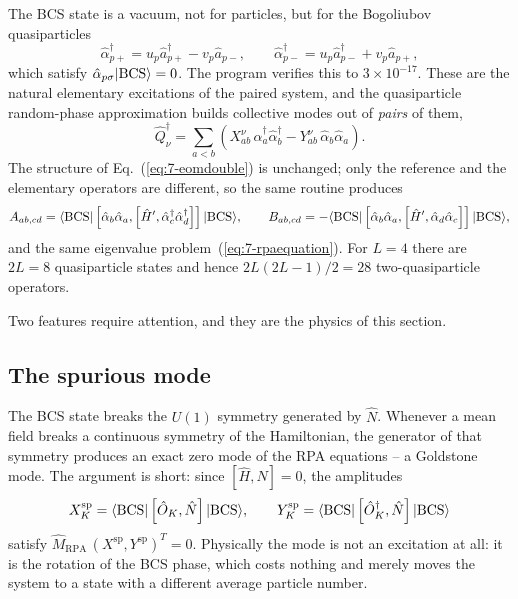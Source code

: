 The BCS state is a vacuum, not for particles, but for the Bogoliubov
quasiparticles
\begin{equation}
  \hat{\alpha}^{\dagger}_{p+} = u_p\hat{a}^{\dagger}_{p+}
    - v_p\hat{a}_{p-},
  \qquad
  \hat{\alpha}^{\dagger}_{p-} = u_p\hat{a}^{\dagger}_{p-}
    + v_p\hat{a}_{p+},
  \label{eq:7-bogoliubov}
\end{equation}
which satisfy $\hat{\alpha}_{p\sigma}\vert \mathrm{BCS} \rangle=0$.  The program
verifies this to $3\times10^{-17}$.  These are the natural elementary
excitations of the paired system, and the quasiparticle random-phase
approximation builds collective modes out of \emph{pairs} of them,
\begin{equation}
  \hat{Q}^{\dagger}_{\nu} = \sum_{a<b}\left(
    X^{\nu}_{ab}\,\hat{\alpha}^{\dagger}_{a}\hat{\alpha}^{\dagger}_{b}
    - Y^{\nu}_{ab}\,\hat{\alpha}_{b}\hat{\alpha}_{a}\right).
  \label{eq:7-qrpaoperator}
\end{equation}
The structure of Eq.~(\ref{eq:7-eomdouble}) is unchanged; only the reference
and the elementary operators are different, so the same routine produces
\begin{equation}
  A_{ab,cd} = \langle \mathrm{BCS} | \left[
    \hat{\alpha}_{b}\hat{\alpha}_{a},
    \left[\hat{H}',
      \hat{\alpha}^{\dagger}_{c}\hat{\alpha}^{\dagger}_{d}\right]\right] | \mathrm{BCS} \rangle,
  \qquad
  B_{ab,cd} = -\langle \mathrm{BCS} | \left[
    \hat{\alpha}_{b}\hat{\alpha}_{a},
    \left[\hat{H}',
      \hat{\alpha}_{d}\hat{\alpha}_{c}\right]\right] | \mathrm{BCS} \rangle,
  \label{eq:7-qrpaAB}
\end{equation}
and the same eigenvalue problem~(\ref{eq:7-rpaequation}).  For $L=4$ there are
$2L=8$ quasiparticle states and hence $2L(2L-1)/2=28$ two-quasiparticle
operators.

Two features require attention, and they are the physics of this section.

\subsection{The spurious mode}
\label{sec:spurious}

The BCS state breaks the $U(1)$ symmetry generated by $\hat{N}$.  Whenever a
mean field breaks a continuous symmetry of the Hamiltonian, the generator of
that symmetry produces an exact zero mode of the RPA equations -- a Goldstone
mode.  The argument is short: since $[\hat{H},\hat{N}]=0$, the amplitudes
\begin{equation}
  X^{\mathrm{sp}}_{K} = \langle \mathrm{BCS} | 
    \left[\hat{O}_K,\hat{N}\right] | \mathrm{BCS} \rangle,
  \qquad
  Y^{\mathrm{sp}}_{K} = \langle \mathrm{BCS} | 
    \left[\hat{O}^{\dagger}_K,\hat{N}\right] | \mathrm{BCS} \rangle
  \label{eq:7-spurious}
\end{equation}
satisfy $\hat{M}_{\mathrm{RPA}}\,(X^{\mathrm{sp}},Y^{\mathrm{sp}})^{T}=0$.
Physically the mode is not an excitation at all: it is the rotation of the
BCS phase, which costs nothing and merely moves the system to a state with a
different average particle number.

